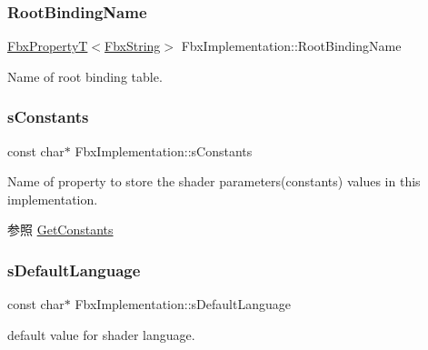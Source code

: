 \subsubsection{\texorpdfstring{Root\+Binding\+Name}{RootBindingName}}
{\footnotesize\ttfamily \hyperlink{class_fbx_property_t}{Fbx\+PropertyT}$<$\hyperlink{class_fbx_string}{Fbx\+String}$>$ Fbx\+Implementation\+::\+Root\+Binding\+Name}



Name of root binding table. 

\mbox{\label{class_fbx_implementation_a16188a40d70a73622c093ba3143fedac}} 
\subsubsection{\texorpdfstring{s\+Constants}{sConstants}}
{\footnotesize\ttfamily const char$\ast$ Fbx\+Implementation\+::s\+Constants\hspace{0.3cm}{\ttfamily [static]}}

Name of property to store the shader parameters(constants) values in this implementation. \begin{DoxySeeAlso}{参照}
\hyperlink{class_fbx_implementation_a6b8a6fd6e27dbd2707dc8264b24ab5c9}{Get\+Constants} 
\end{DoxySeeAlso}
\mbox{\label{class_fbx_implementation_a41d0841fb6321eb5a01447e7effde11f}} 
\subsubsection{\texorpdfstring{s\+Default\+Language}{sDefaultLanguage}}
{\footnotesize\ttfamily const char$\ast$ Fbx\+Implementation\+::s\+Default\+Language\hspace{0.3cm}{\ttfamily [static]}}



default value for shader language. 

\mbox{\label{class_fbx_implementation_ac2aab3ea236712a7884780d6a8b4dbd7}} 
